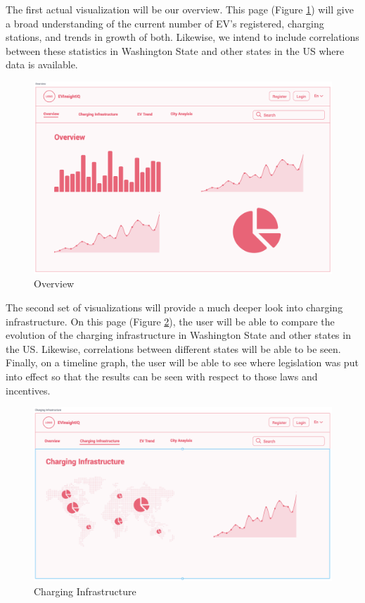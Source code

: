 \documentclass{article}
\begin{document}
The first actual visualization will be our overview.  This page (Figure \ref{fig:overview}) will give a
broad understanding of the current number of EV's registered, charging stations,
and trends in growth of both.  Likewise, we intend to include correlations
between these statistics in Washington State and other states in the US where
data is available.
\begin{figure}[h]
    \centering
    \includegraphics[scale=0.25]{Overview}
    \caption{Overview}
    \label{fig:overview}
\end{figure}

The second set of visualizations will provide a much deeper look into charging
infrastructure.  On this page (Figure \ref{fig:charge}), the user will be able
to compare the evolution of the charging infrastructure in Washington State and
other states in the US.  Likewise, correlations between different states will be
able to be seen.  Finally, on a timeline graph, the user will be able to see
where legislation was put into effect so that the results can be seen with
respect to those laws and incentives.
\begin{figure}[h]
    \centering
    \includegraphics[scale=0.25]{Charging Infrastructure}
    \caption{Charging Infrastructure}
    \label{fig:charge}
\end{figure}
\end{document}
